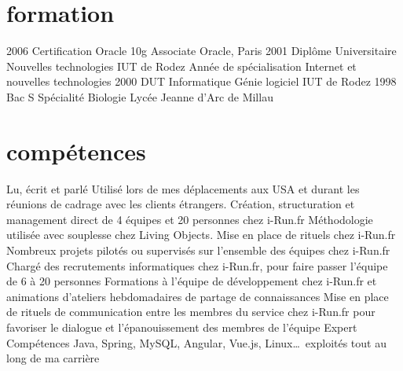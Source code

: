 \documentclass{friggeri-cv} 	%
\begin{document}

\section{formation}

\begin{entrylist}
\entry
{2006}
{Certification Oracle {\normalfont 10g Associate}}
{Oracle, Paris}
{}
\entry
{2001}
{Diplôme Universitaire {\normalfont Nouvelles technologies}}
{IUT de Rodez}
{Année de spécialisation Internet et nouvelles technologies}
\entry
{2000}
{DUT {\normalfont Informatique Génie logiciel}}
{IUT de Rodez}
{}
\entry
{1998}
{Bac S {\normalfont Spécialité Biologie}}
{Lycée Jeanne d’Arc de Millau}
{}
\end{entrylist}


\section{compétences}

\begin{capabilitize}
		{Lu, écrit et parlé}
		{Utilisé lors de mes déplacements aux USA et durant les réunions de cadrage avec les clients
		étrangers.}
		{}
		{Création, structuration et management direct de 4 équipes et 20 personnes chez i-Run.fr}
		{}
		{Méthodologie utilisée avec souplesse chez Living Objects. Mise en place de rituels chez i-Run.fr}
		{}
		{Nombreux projets pilotés ou supervisés sur l’ensemble des équipes chez i-Run.fr}
		{}
		{Chargé des recrutements informatiques chez i-Run.fr, pour faire passer l’équipe de 6 à 20 personnes}
        {}
        {Formations à l’équipe de développement chez i-Run.fr et animations d’ateliers hebdomadaires de partage de connaissances}
		{}
		{Mise en place de rituels de communication entre les membres du service chez i-Run.fr pour favoriser le dialogue 
        et l’épanouissement des membres de l’équipe}
		{Expert}
		{Compétences Java, Spring, MySQL, Angular, Vue.js, Linux\dots\ exploités tout au long de ma carrière}
\end{capabilitize}
\end{document}
